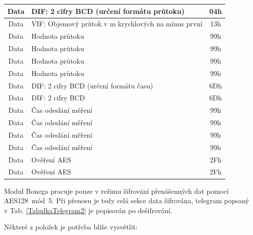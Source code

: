 \begin{table}[!ht]
{\begin{tabular}{|c|l|c|}
Data               & DIF: 2 cifry BCD (určení formátu průtoku)      & 04h              \\ \hline
Data               & VIF: Objemový průtok v m krychlových na mínus první & 13h         \\ \hline
Data               & Hodnota průtoku                               & 99h               \\ \hline
Data               & Hodnota průtoku                               & 99h               \\ \hline
Data               & Hodnota průtoku                               & 99h               \\ \hline
Data               & Hodnota průtoku                               & 99h               \\ \hline
Data               & DIF: 2 cifry BCD (určení formátu času)         & 6Dh              \\ \hline
Data               & DIF: 2 cifry BCD                               & 6Dh              \\ \hline
Data               & Čas odeslání měření                           & 99h               \\ \hline
Data               & Čas odeslání měření                           & 99h               \\ \hline
Data               & Čas odeslání měření                           & 99h               \\ \hline
Data               & Čas odeslání měření                           & 99h               \\ \hline	
Data						   & Ověření AES                                    & 2Fh              \\ \hline
Data						   & Ověření AES                                    & 2Fh              \\ \hline

\end{tabular}}
\end{table}

\newpage{}

Modul Bonega pracuje pouze v režimu šifrování přenášenných dat pomocí AES128~mód~5. Při přenosu je tedy celá sekce data šifrována, telegram popsaný v Tab. \ref{TabulkaTelegram2} je popisován po dešifrování.

Některé z položek je potřeba blíže vysvětlit:

